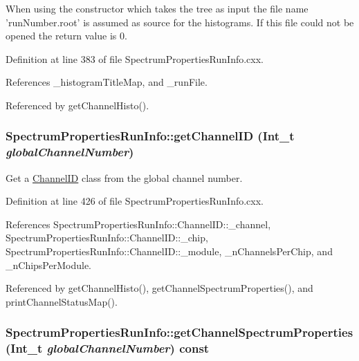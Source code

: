 When using the constructor which takes the tree as input the file name 'runNumber.root' is assumed as source for the histograms. If this file could not be opened the return value is 0. 

Definition at line 383 of file SpectrumPropertiesRunInfo.cxx.

References \_\-histogramTitleMap, and \_\-runFile.

Referenced by getChannelHisto().\hypertarget{class_spectrum_properties_run_info_a0183a3e0b2724b37e0221aee0ef8195a}{
\subsubsection[{getChannelID}]{ SpectrumPropertiesRunInfo::getChannelID (Int\_\-t {\em globalChannelNumber})}}
\label{class_spectrum_properties_run_info_a0183a3e0b2724b37e0221aee0ef8195a}


Get a \hyperlink{class_spectrum_properties_run_info_1_1_channel_i_d}{ChannelID} class from the global channel number. 

Definition at line 426 of file SpectrumPropertiesRunInfo.cxx.

References SpectrumPropertiesRunInfo::ChannelID::\_\-channel, SpectrumPropertiesRunInfo::ChannelID::\_\-chip, SpectrumPropertiesRunInfo::ChannelID::\_\-module, \_\-nChannelsPerChip, and \_\-nChipsPerModule.

Referenced by getChannelHisto(), getChannelSpectrumProperties(), and printChannelStatusMap().\hypertarget{class_spectrum_properties_run_info_aa3a3a6c0169bffdc12b9940cd085344c}{
\subsubsection[{getChannelSpectrumProperties}]{ SpectrumPropertiesRunInfo::getChannelSpectrumProperties (Int\_\-t {\em globalChannelNumber}) const}}
\label{class_spectrum_properties_run_info_aa3a3a6c0169bffdc12b9940cd085344c}


